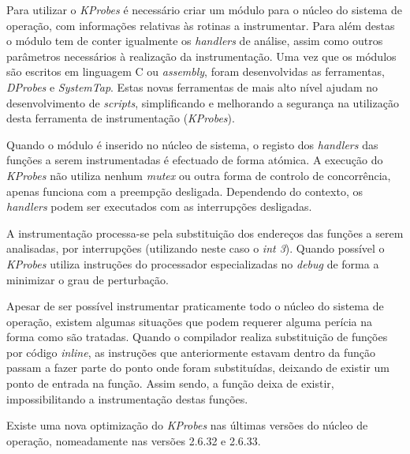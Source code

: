 Para utilizar o \textit{KProbes} é necessário criar um módulo para o núcleo do sistema de operação, com informações relativas às rotinas a instrumentar.
Para além destas o módulo tem de conter igualmente os \textit{handlers} de análise, assim como outros parâmetros necessários à realização da instrumentação.
Uma vez que os módulos são escritos em linguagem C ou \textit{assembly}, foram desenvolvidas as ferramentas, \textit{DProbes} e \textit{SystemTap}.
Estas novas ferramentas de mais alto nível ajudam no desenvolvimento de \textit{scripts}, simplificando e melhorando a segurança na utilização desta ferramenta de instrumentação (\textit{KProbes}).

Quando o módulo é inserido no núcleo de sistema, o registo dos \textit{handlers} das funções a serem instrumentadas é efectuado de forma atómica.
A execução do \textit{KProbes} não utiliza nenhum \textit{mutex} ou outra forma de controlo de concorrência, apenas funciona com a preempção desligada.
Dependendo do contexto, os \textit{handlers} podem ser executados com as interrupções desligadas.

A instrumentação processa-se pela substituição dos endereços das funções a serem analisadas, por interrupções (utilizando neste caso o \textit{int 3}).
Quando possível o \textit{KProbes} utiliza instruções do processador especializadas no \textit{debug} de forma a minimizar o grau de perturbação.

Apesar de ser possível instrumentar praticamente todo o núcleo do sistema de operação, existem algumas situações que podem requerer alguma perícia na forma como são tratadas.
Quando o compilador realiza substituição de funções por código \textit{inline}, as instruções que anteriormente estavam dentro da função passam a fazer parte do ponto onde foram substituídas, deixando de existir um ponto de entrada na função.
Assim sendo, a função deixa de existir, impossibilitando a instrumentação destas funções.

Existe uma nova optimização do \textit{KProbes} nas últimas versões do núcleo de operação, nomeadamente nas versões 2.6.32 e 2.6.33.


